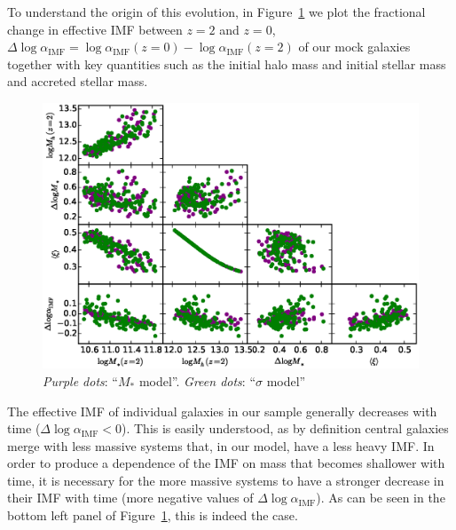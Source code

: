 \documentclass[usenatbib, letters]{mnras}
\def\aimf{\alpha_{\mathrm{IMF}}}
\def\Fref#1{Figure~\ref{#1}\xspace}
\begin{document}
To understand the origin of this evolution, in \Fref{fig:cornerplot} we plot the fractional change in effective IMF between $z=2$ and $z=0$, $\Delta\log{\aimf}=\log{\aimf}(z=0)-\log{\aimf}(z=2)$ of our mock galaxies together with key quantities such as the initial halo mass and initial stellar mass and accreted stellar mass. 
%
\begin{figure}
 \includegraphics[width=\textwidth]{cornerplot.eps}
 \caption{{\em Purple dots}: ``$M_*$ model''. {\em Green dots}: ``$\sigma$ model''
}
 \label{fig:cornerplot}
\end{figure}
%
The effective IMF of individual galaxies in our sample generally decreases with time ($\Delta\log{\aimf}<0$). This is easily understood, as by definition central galaxies merge with less massive systems that, in our model, have a less heavy IMF. 
In order to produce a dependence of the IMF on mass that becomes shallower with time, it is necessary for the more massive systems to have a stronger decrease in their IMF with time (more negative values of $\Delta\log{\aimf}$).
As can be seen in the bottom left panel of \Fref{fig:cornerplot}, this is indeed the case.
\end{document}
